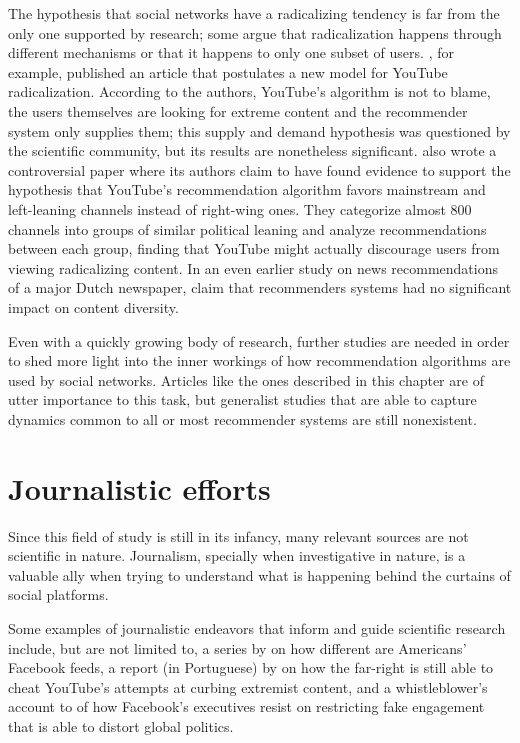 The hypothesis that social networks have a radicalizing tendency is far from the
only one supported by research; some argue that radicalization happens through
different mechanisms or that it happens to only one subset of users.
\citet{munger_right-wing_2020}, for example, published an article that
postulates a new model for YouTube radicalization. According to the authors,
YouTube's algorithm is not to blame, the users themselves are looking for
extreme content and the recommender system only supplies them; this supply and
demand hypothesis was questioned by the scientific community, but its results
are nonetheless significant. \citet{ledwich_algorithmic_2019} also wrote a
controversial paper where its authors claim to have found evidence to support
the hypothesis that YouTube's recommendation algorithm favors mainstream and
left-leaning channels instead of right-wing ones. They categorize almost 800
channels into groups of similar political leaning and analyze recommendations
between each group, finding that YouTube might actually discourage users from
viewing radicalizing content. In an even earlier study on news recommendations
of a major Dutch newspaper, \citet{moller_not_2018} claim that recommenders
systems had no significant impact on content diversity.

Even with a quickly growing body of research, further studies are needed in
order to shed more light into the inner workings of how recommendation
algorithms are used by social networks. Articles like the ones described in this
chapter are of utter importance to this task, but generalist studies that are
able to capture dynamics common to all or most recommender systems are still
nonexistent.

\section{Journalistic efforts}
\label{cap:journalistic}

Since this field of study is still in its infancy, many relevant sources are not
scientific in nature. Journalism, specially when investigative in nature, is a
valuable ally when trying to understand what is happening behind the curtains of
social platforms.

Some examples of journalistic endeavors that inform and guide scientific
research include, but are not limited to, a series by \citet{lecher_one_nodate}
on how different are Americans' Facebook feeds, a report (in Portuguese) by
\citet{ribeiro_como_2021} on how the far-right is still able to cheat YouTube's
attempts at curbing extremist content, and a whistleblower's account to
\citet{wong_how_2021} of how Facebook's executives resist on restricting
fake engagement that is able to distort global politics.
